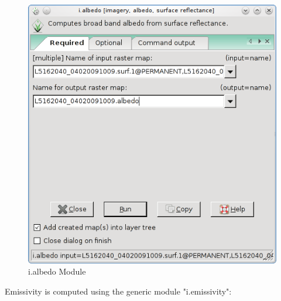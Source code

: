 \begin{figure}[htbp]
   \centering
   \includegraphics[scale=0.4]{gipe018.png}
   \caption{i.albedo Module}
   \label{fig:gipe018}
\end{figure}

Emissivity is computed using the generic module "i.emissivity":\newline


